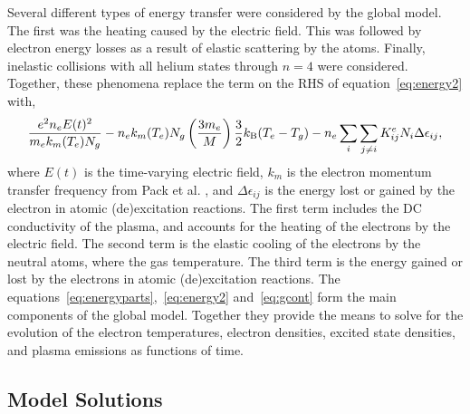 Several different types of energy transfer were considered by the global model.
The first was the heating caused by the electric field. This was followed by
electron energy losses as a result of elastic scattering by the atoms. Finally,
inelastic collisions with all helium states through $n=4$ were considered.
Together, these phenomena replace the term on the RHS of
equation~\ref{eq:energy2} with,
\begin{equation}
  \frac{e^2n_eE(t)^2}{m_ek_m(T_e)N_g}
  - n_ek_m(T_e)N_g\left(\frac{3m_e}{M}\right)\frac{3}{2}k_\mathrm{B}(T_e-T_g)
  - n_e \sum_i \sum_{j\neq i} K^e_{ij}N_i\Delta\epsilon_{ij},
  \label{eq:energyparts}
\end{equation}
where $E(t)$ is the time-varying electric field, $k_m$ is the electron momentum
transfer frequency from Pack et al. \cite{Pack1992}, and $\Delta\epsilon_{ij}$
is the energy lost or gained by the electron in atomic (de)excitation reactions.
The first term includes the DC conductivity \cite{Lieberman2005} of the plasma,
and accounts for the heating of the electrons by the electric field. The second
term is the elastic cooling of the electrons by the neutral atoms, where the gas
temperature. The third term is the energy gained or lost by the electrons in
atomic (de)excitation reactions. The
equations~\ref{eq:energyparts},~\ref{eq:energy2} and~\ref{eq:gcont} form the
main components of the global model. Together they provide the means to solve
for the evolution of the electron temperatures, electron densities, excited
state densities, and plasma emissions as functions of time.

\subsection{Model Solutions}

